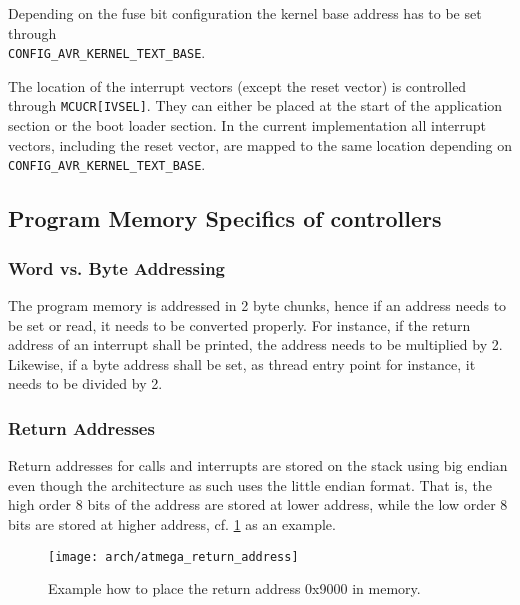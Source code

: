 		Depending on the fuse bit configuration the kernel base address has to be set through\\\lstinline{CONFIG_AVR_KERNEL_TEXT_BASE}. 

		The location of the interrupt vectors (except the reset vector) is controlled through \lstinline{MCUCR[IVSEL]}. They can either be placed at the start of the application section or the boot loader section. In the current implementation all interrupt vectors, including the reset vector, are mapped to the same location depending on \lstinline{CONFIG_AVR_KERNEL_TEXT_BASE}.

	\subsection{Program Memory Specifics of \atmega controllers}
		\subsubsection{Word vs. Byte Addressing}
			The \avr program memory is addressed in 2 byte chunks, hence if an address needs to be set or read, it needs to be converted properly. For instance, if the return address of an interrupt shall be printed, the address needs to be multiplied by 2. Likewise, if a byte address shall be set, as thread entry point for instance, it needs to be divided by 2.

		\subsubsection{Return Addresses}
			Return addresses for calls and interrupts are stored on the stack using big endian even though the \atmega architecture as such uses the little endian format. That is, the high order 8 bits of the address are stored at lower address, while the low order 8 bits are stored at higher address, cf. \ref{fig:atmega_return_address} as an example.
			\begin{figure}[h]
				\centering	
				\texttt{[image: arch/atmega\_return\_address]}
				\caption{Example how to place the return address 0x9000 in memory.}
				\label{fig:atmega_return_address}
			\end{figure}
